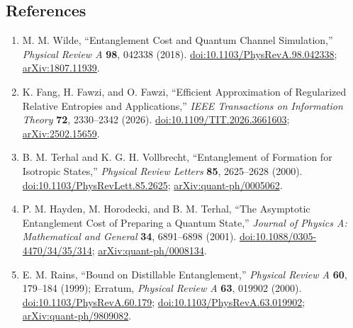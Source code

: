 \subsection*{References}

\begin{enumerate}[label={},leftmargin=4.8em,labelsep=0.5em]
  \footnotesize
  \item[\textup{[Wil18]}]\label{ref:27b7-wilde}
  M. M. Wilde,
  ``Entanglement Cost and Quantum Channel Simulation,''
  \emph{Physical Review A} \textbf{98}, 042338 (2018).
  \href{https://doi.org/10.1103/PhysRevA.98.042338}{doi:10.1103/PhysRevA.98.042338};
  \href{https://arxiv.org/abs/1807.11939}{arXiv:1807.11939}.

  \item[\textup{[FFF26]}]\label{ref:27b7-fang-fawzi-fawzi}
  K. Fang, H. Fawzi, and O. Fawzi,
  ``Efficient Approximation of Regularized Relative Entropies and
  Applications,''
  \emph{IEEE Transactions on Information Theory} \textbf{72}, 2330--2342 (2026).
  \href{https://doi.org/10.1109/TIT.2026.3661603}{doi:10.1109/TIT.2026.3661603};
  \href{https://arxiv.org/abs/2502.15659}{arXiv:2502.15659}.

  \item[\textup{[TV00]}]\label{ref:27b7-terhal-vollbrecht}
  B. M. Terhal and K. G. H. Vollbrecht,
  ``Entanglement of Formation for Isotropic States,''
  \emph{Physical Review Letters} \textbf{85}, 2625--2628 (2000).
  \href{https://doi.org/10.1103/PhysRevLett.85.2625}{doi:10.1103/PhysRevLett.85.2625};
  \href{https://arxiv.org/abs/quant-ph/0005062}{arXiv:quant-ph/0005062}.

  \item[\textup{[HHT01]}]\label{ref:27b7-hayden-horodecki-terhal}
  P. M. Hayden, M. Horodecki, and B. M. Terhal,
  ``The Asymptotic Entanglement Cost of Preparing a Quantum State,''
  \emph{Journal of Physics A: Mathematical and General} \textbf{34},
  6891--6898 (2001).
  \href{https://doi.org/10.1088/0305-4470/34/35/314}{doi:10.1088/0305-4470/34/35/314};
  \href{https://arxiv.org/abs/quant-ph/0008134}{arXiv:quant-ph/0008134}.

  \item[\textup{[Rai99]}]\label{ref:27b7-rains}
  E. M. Rains,
  ``Bound on Distillable Entanglement,''
  \emph{Physical Review A} \textbf{60}, 179--184 (1999); Erratum,
  \emph{Physical Review A} \textbf{63}, 019902 (2000).
  \href{https://doi.org/10.1103/PhysRevA.60.179}{doi:10.1103/PhysRevA.60.179};
  \href{https://doi.org/10.1103/PhysRevA.63.019902}{doi:10.1103/PhysRevA.63.019902};
  \href{https://arxiv.org/abs/quant-ph/9809082}{arXiv:quant-ph/9809082}.


\end{enumerate}
